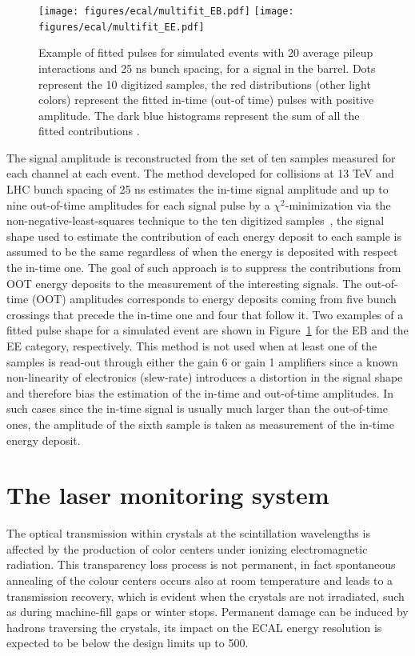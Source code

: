 \begin{figure}[!h]
  \centering
  \texttt{[image: figures/ecal/multifit\_EB.pdf]}
  \texttt{[image: figures/ecal/multifit\_EE.pdf]}
  \caption{Example of fitted pulses for simulated events with 20 average pileup interactions and 25 ns bunch spacing, for a signal in the barrel. Dots represent the 10 digitized samples, the red distributions (other light colors) represent the fitted in-time (out-of time) pulses with positive amplitude. The dark blue histograms represent the sum of all the fitted contributions \cite{Multifit}.}
  \label{fig:multifit_for_dummies}
\end{figure}

The signal amplitude is reconstructed from the set of ten samples measured for each channel at each event.
The method developed for collisions at 13 TeV and LHC bunch spacing of 25 ns estimates
the in-time signal amplitude and up to nine out-of-time
amplitudes for each signal pulse by a $\chi^2$-minimization via the non-negative-least-squares
technique to the ten digitized samples~\cite{Multifit}, the signal shape used to estimate the contribution of each
energy deposit to each sample is assumed to be the same regardless of when the energy is deposited with respect
the in-time one.
The goal of such approach is to suppress the contributions from OOT energy deposits
to the measurement of the interesting signals.
The out-of-time (OOT) amplitudes corresponds to
energy deposits coming from five bunch crossings that precede the in-time one and four that follow it.
Two examples of a fitted pulse shape for
a simulated event are shown in Figure~\ref{fig:multifit_for_dummies} for the EB and the EE category, respectively.
This method is not used when at least one of the samples is read-out through either the gain 6 or gain 1
amplifiers since a known non-linearity of electronics (slew-rate) introduces a distortion in the signal shape
and therefore bias the estimation of the in-time and out-of-time amplitudes.
In such cases since the in-time signal is usually much larger than the out-of-time ones,
the amplitude of the sixth sample is taken as measurement of the in-time energy deposit.

\section{The laser monitoring system}
\label{sec:laser}
The optical transmission within crystals at the scintillation wavelengths is affected by the production
of color centers under ionizing electromagnetic radiation. This transparency loss process is not permanent,
in fact spontaneous annealing of the colour centers occurs also at room temperature and leads
to a transmission recovery, which is evident when the crystals are not irradiated, such as during
machine-fill gaps or winter stops.
Permanent damage can be induced by hadrons traversing the crystals, its impact on the ECAL energy resolution
is expected to be below the design limits up to 500\fbinv.

